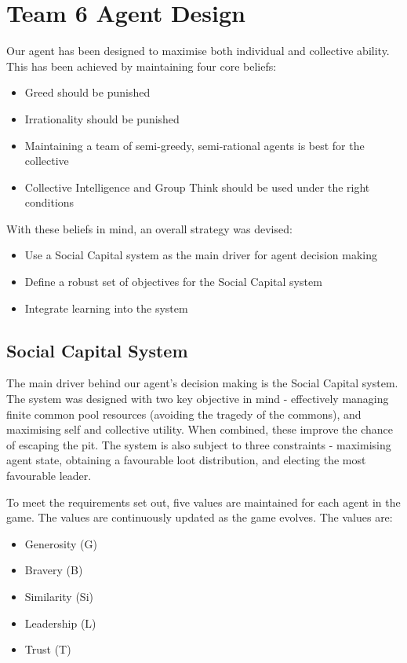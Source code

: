 \chapter{Team 6 Agent Design}\label{team_6_agent_design}

Our agent has been designed to maximise both individual and collective ability. This has been achieved by maintaining four core beliefs:

\begin{itemize}
    \item Greed should be punished
    \item Irrationality should be punished
    \item Maintaining a team of semi-greedy, semi-rational agents is best for the collective
    \item Collective Intelligence and Group Think should be used under the right conditions
\end{itemize}
With these beliefs in mind, an overall strategy was devised:
\begin{itemize}
    \item Use a Social Capital system as the main driver for agent decision making
    \item Define a robust set of objectives for the Social Capital system
    \item Integrate learning into the system
\end{itemize}

\section{Social Capital System}

The main driver behind our agent's decision making is the Social Capital system. The system was designed with two key objective in mind - effectively managing finite common pool resources (avoiding the tragedy of the commons), and maximising self and collective utility. When combined, these improve the chance of escaping the pit. The system is also subject to three constraints - maximising agent state, obtaining a favourable loot distribution, and electing the most favourable leader.

To meet the requirements set out, five values are maintained for each agent in the game. The values are continuously updated as the game evolves. The values are:

\begin{itemize}
    \item Generosity (G)
    \item Bravery (B)
    \item Similarity (Si)
    \item Leadership (L)
    \item Trust (T)
\end{itemize}